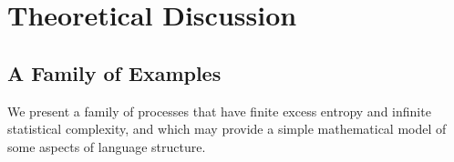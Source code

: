 \documentclass[11pt,letterpaper]{article}
\begin{document}

%
%
%
%
%
%
%
%



\section{Theoretical Discussion}


\subsection{A Family of Examples}
We present a family of processes that have finite excess entropy and infinite statistical complexity, and which may provide a simple mathematical model of some aspects of language structure.
\end{document}
